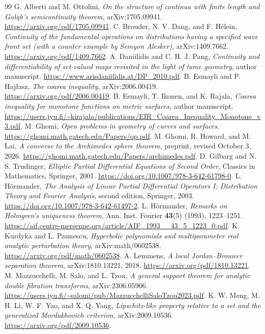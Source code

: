 \documentclass[11pt]{article}
\begin{document}
\begin{thebibliography}{99}
 G. Alberti and M. Ottolini, \emph{On the structure of continua with finite length and Go\l\k{a}b's semicontinuity theorem}, arXiv:1705.09941. \url{https://arxiv.org/pdf/1705.09941}.
 C. Brouder, N. V. Dang, and F. H\'elein, \emph{Continuity of the fundamental operations on distributions having a specified wave front set (with a counter example by Semyon Alesker)}, arXiv:1409.7662. \url{https://arxiv.org/pdf/1409.7662}.
 A. Daniilidis and C. H. J. Pang, \emph{Continuity and differentiability of set-valued maps revisited in the light of tame geometry}, author manuscript. \url{https://www.arisdaniilidis.at/DP_2010.pdf}.
 B. Esmayli and P. Haj\l asz, \emph{The coarea inequality}, arXiv:2006.00419. \url{https://arxiv.org/pdf/2006.00419}.
 B. Esmayli, T. Ikonen, and K. Rajala, \emph{Coarea inequality for monotone functions on metric surfaces}, author manuscript. \url{https://users.jyu.fi/~kirajala/publications/EIR_Coarea_Inequality_Monotone_v3.pdf}.
 M. Ghomi, \emph{Open problems in geometry of curves and surfaces}. \url{https://ghomi.math.gatech.edu/Papers/op.pdf}.
 M. Ghomi, R. Howard, and M. Lai, \emph{A converse to the Archimedes sphere theorem}, preprint, revised October 3, 2026. \url{https://ghomi.math.gatech.edu/Papers/archimedes.pdf}.
 D. Gilbarg and N. S. Trudinger, \emph{Elliptic Partial Differential Equations of Second Order}, Classics in Mathematics, Springer, 2001. \url{https://doi.org/10.1007/978-3-642-61798-0}.
 L. H\"ormander, \emph{The Analysis of Linear Partial Differential Operators I: Distribution Theory and Fourier Analysis}, second edition, Springer, 2003. \url{https://doi.org/10.1007/978-3-642-61497-2}.
 L. H\"ormander, \emph{Remarks on Holmgren's uniqueness theorem}, Ann. Inst. Fourier \textbf{43}(5) (1993), 1223--1251. \url{https://aif.centre-mersenne.org/article/AIF_1993__43_5_1223_0.pdf}.
 K. Kurdyka and L. Paunescu, \emph{Hyperbolic polynomials and multiparameter real analytic perturbation theory}, arXiv:math/0602538. \url{https://arxiv.org/pdf/math/0602538}.
 A. Lemmens, \emph{A local Jordan--Brouwer separation theorem}, arXiv:1810.13221, 2018. \url{https://arxiv.org/pdf/1810.13221}.
 M. Mazzucchelli, M. Salo, and L. Tzou, \emph{A general support theorem for analytic double fibration transforms}, arXiv:2306.05906. \url{https://users.jyu.fi/~salomi/pub/MazzucchelliSaloTzou2023.pdf}.
 K. W. Meng, M. H. Li, W. F. Yao, and X. Q. Yang, \emph{Lipschitz-like property relative to a set and the generalized Mordukhovich criterion}, arXiv:2009.10536. \url{https://arxiv.org/pdf/2009.10536}.

\end{thebibliography}
\end{document}
